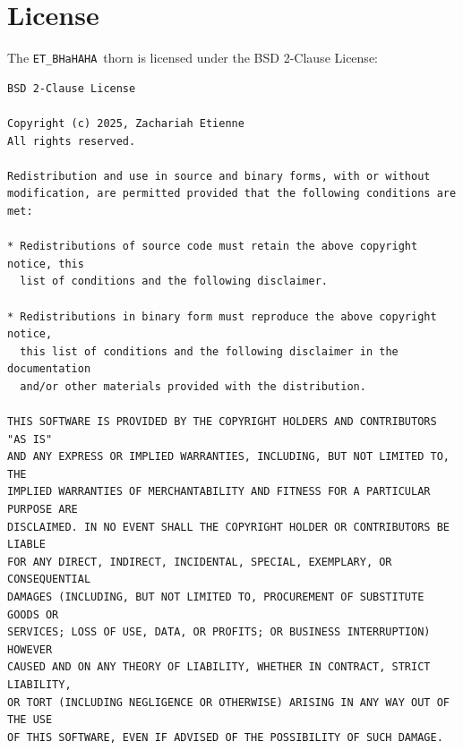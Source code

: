 \documentclass[a4paper,11pt]{article}
\newcommand{\thorn}[1]{{\tt #1}}
\newcommand{\BHaHAHA}{\thorn{ET\_BHaHAHA}} %
\begin{document}
\section{License}
\label{sec:license}
The \BHaHAHA\ thorn is licensed under the BSD 2-Clause License:
\begin{verbatim}
BSD 2-Clause License

Copyright (c) 2025, Zachariah Etienne
All rights reserved.

Redistribution and use in source and binary forms, with or without
modification, are permitted provided that the following conditions are met:

* Redistributions of source code must retain the above copyright notice, this
  list of conditions and the following disclaimer.

* Redistributions in binary form must reproduce the above copyright notice,
  this list of conditions and the following disclaimer in the documentation
  and/or other materials provided with the distribution.

THIS SOFTWARE IS PROVIDED BY THE COPYRIGHT HOLDERS AND CONTRIBUTORS "AS IS"
AND ANY EXPRESS OR IMPLIED WARRANTIES, INCLUDING, BUT NOT LIMITED TO, THE
IMPLIED WARRANTIES OF MERCHANTABILITY AND FITNESS FOR A PARTICULAR PURPOSE ARE
DISCLAIMED. IN NO EVENT SHALL THE COPYRIGHT HOLDER OR CONTRIBUTORS BE LIABLE
FOR ANY DIRECT, INDIRECT, INCIDENTAL, SPECIAL, EXEMPLARY, OR CONSEQUENTIAL
DAMAGES (INCLUDING, BUT NOT LIMITED TO, PROCUREMENT OF SUBSTITUTE GOODS OR
SERVICES; LOSS OF USE, DATA, OR PROFITS; OR BUSINESS INTERRUPTION) HOWEVER
CAUSED AND ON ANY THEORY OF LIABILITY, WHETHER IN CONTRACT, STRICT LIABILITY,
OR TORT (INCLUDING NEGLIGENCE OR OTHERWISE) ARISING IN ANY WAY OUT OF THE USE
OF THIS SOFTWARE, EVEN IF ADVISED OF THE POSSIBILITY OF SUCH DAMAGE.
\end{verbatim}
\end{document}
